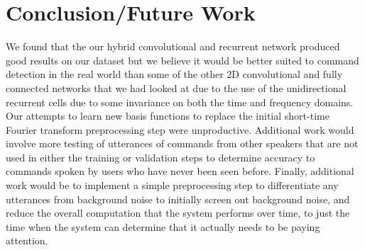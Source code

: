 \documentclass{article}
\begin{document}
\section{Conclusion/Future Work }
We found that the our hybrid convolutional and recurrent network
produced good results on our dataset but we believe it would be better
suited to command detection in the real world than some of the other 2D
convolutional and fully connected networks that we had looked at due
to the use of the unidirectional recurrent cells due to
some invariance on both the time and frequency domains. Our attempts
to learn new basis functions to replace the initial short-time Fourier
transform preprocessing step were unproductive. Additional work would
involve more testing of utterances of commands from other speakers
that are not used in either the training or validation steps to
determine accuracy to commands spoken by users who have never been
seen before. Finally, additional work would be to implement a simple
preprocessing step to differentiate any utterances from background
noise to initially screen out background noise, and reduce the overall
computation that the system performs over time, to just the time when
the system can determine that it actually needs to be paying attention.

{}


\newpage
\end{document}
